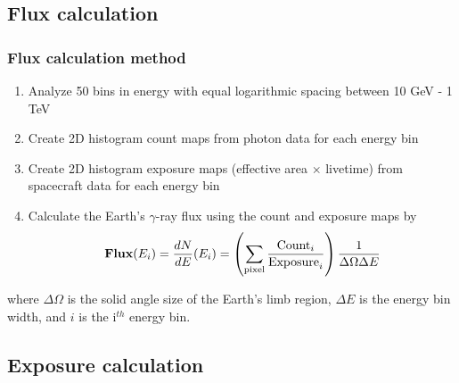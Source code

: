 \documentclass{beamer}
\begin{document}
\subsection{Flux calculation}
\begin{frame}
\frametitle{Flux calculation method}
\begin{enumerate}
  \item Analyze 50 bins in energy with equal logarithmic
  spacing between 10 GeV - 1 TeV  
  \item Create 2D histogram count maps from photon
  data for each energy bin
  \item Create 2D histogram exposure maps
  (effective area $\times$ livetime) from spacecraft data
  for each energy bin
  \item Calculate the Earth's $\gamma$-ray flux using the count and exposure maps by
  \begin{equation*}
    \textbf{Flux}(E_i) =  \frac{dN}{dE}(E_i) = \left(\sum_{\rm pixel} \frac{\text{Count}_i}{\text{Exposure}_i}\right) \frac{1}{\Delta\Omega\Delta E}
    \label{eq:def_flux}
  \end{equation*}
\end{enumerate}
where $\Delta \Omega$ is the solid angle size of the
Earth's limb region, $\Delta E$ is the energy bin width,
and $i$ is the i$^{th}$ energy bin.
\end{frame}


\subsection{Exposure calculation}
\end{document}
